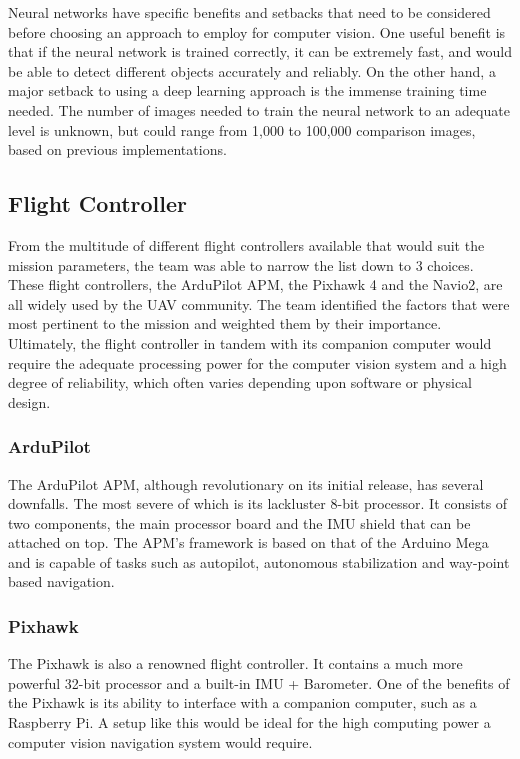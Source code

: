			Neural networks have specific benefits and setbacks that need to be considered before choosing an approach to employ for computer vision. One useful benefit is that if the neural network is trained correctly, it can be extremely fast, and would be able to detect different objects accurately and reliably. On the other hand, a major setback to using a deep learning approach is the immense training time needed. The number of images needed to train the neural network to an adequate level is unknown, but could range from 1,000 to 100,000 comparison images, based on previous implementations.

	\subsection{Flight Controller}
		From the multitude of different flight controllers available that would suit the mission parameters, the team was able to narrow the list down to 3 choices. These flight controllers, the ArduPilot APM, the Pixhawk 4 and the Navio2, are all widely used by the UAV community. The team identified the factors that were most pertinent to the mission and weighted them by their importance. Ultimately, the flight controller in tandem with its companion computer would require the adequate processing power for the computer vision system and a high degree of reliability, which often varies depending upon software or physical design.

		\subsubsection{ArduPilot}
			The ArduPilot APM, although revolutionary on its initial release, has several downfalls. The most severe of which is its lackluster 8-bit processor. It consists of two components, the main processor board and the IMU shield that can be attached on top. The APM’s framework is based on that of the Arduino Mega and is capable of tasks such as autopilot, autonomous stabilization and way-point based navigation.

		\subsubsection{Pixhawk}
			The Pixhawk is also a renowned flight controller. It contains a much more powerful 32-bit processor and a built-in IMU + Barometer. One of the benefits of the Pixhawk is its ability to interface with a companion computer, such as a Raspberry Pi. A setup like this would be ideal for the high computing power a computer vision navigation system would require.

